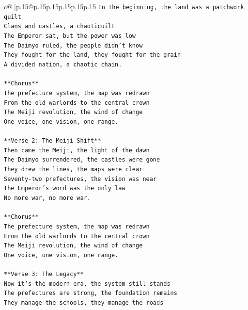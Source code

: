 \documentclass{article}
\begin{document}
{\begin{supertabular}{c@{$\;$}|p{.15\linewidth}@{}p{.15\linewidth}p{.15\linewidth}p{.15\linewidth}p{.15\linewidth}p{.15\linewidth}}
{{{\texttt{In the beginning, the land was a patchwork quilt} \\
\texttt{Clans and castles, a chaoticuilt} \\
\texttt{The Emperor sat, but the power was low} \\
\texttt{The Daimyo ruled, the people didn't know} \\
\texttt{They fought for the land, they fought for the grain} \\
\texttt{A divided nation, a chaotic chain.} \\
\\ 
\texttt{**Chorus**} \\
\texttt{The prefecture system, the map was redrawn} \\
\texttt{From the old warlords to the central crown} \\
\texttt{The Meiji revolution, the wind of change} \\
\texttt{One voice, one vision, one range.} \\
\\ 
\texttt{**Verse 2: The Meiji Shift**} \\
\texttt{Then came the Meiji, the light of the dawn} \\
\texttt{The Daimyo surrendered, the castles were gone} \\
\texttt{They drew the lines, the maps were clear} \\
\texttt{Seventy{-}two prefectures, the vision was near} \\
\texttt{The Emperor's word was the only law} \\
\texttt{No more war, no more war.} \\
\\ 
\texttt{**Chorus**} \\
\texttt{The prefecture system, the map was redrawn} \\
\texttt{From the old warlords to the central crown} \\
\texttt{The Meiji revolution, the wind of change} \\
\texttt{One voice, one vision, one range.} \\
\\ 
\texttt{**Verse 3: The Legacy**} \\
\texttt{Now it's the modern era, the system still stands} \\
\texttt{The prefectures are strong, the foundation remains} \\
\texttt{They manage the schools, they manage the roads} \\
}}}
\end{supertabular}}
\end{document}
